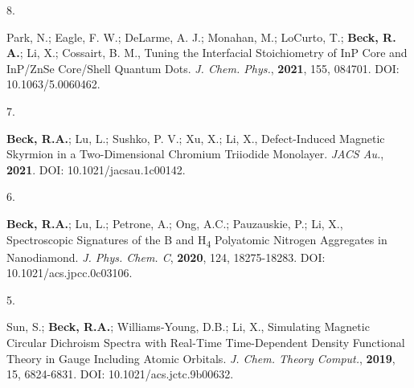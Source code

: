 

\begin{cvpublications}


\cvpublication
{8.}
{\parbox[t]{0.95\textwidth}{\strut Park, N.; Eagle, F. W.; DeLarme, A. J.; Monahan, M.; LoCurto, T.; \textbf{Beck, R. A.}; Li, X.; Cossairt, B. M.,
Tuning the Interfacial Stoichiometry of InP Core and InP/ZnSe Core/Shell Quantum Dots.
\textit{J. Chem. Phys.}, \textbf{2021}, 155, 084701.
DOI: 10.1063/5.0060462.}}




\cvpublication
{7.}
{\parbox[t]{0.95\textwidth}{\strut \textbf{Beck, R.A.}; Lu, L.; Sushko, P. V.; Xu, X.; Li, X.,
Defect-Induced Magnetic Skyrmion in a Two-Dimensional Chromium Triiodide Monolayer.
\textit{JACS Au.}, \textbf{2021}. 
DOI: 10.1021/jacsau.1c00142.}}




\cvpublication
{6.}
{\parbox[t]{0.95\textwidth}{\strut \textbf{Beck, R.A.}; Lu, L.; Petrone, A.; Ong, A.C.; Pauzauskie, P.; Li, X., 
Spectroscopic Signatures of the B and H\textsubscript{4} Polyatomic Nitrogen Aggregates in Nanodiamond.
\textit{J. Phys. Chem. C}, \textbf{2020}, 124, 18275-18283.
DOI: 10.1021/acs.jpcc.0c03106.}}




\cvpublication
{5.}
{\parbox[t]{0.95\textwidth}{\strut Sun, S.; \textbf{Beck, R.A.}; Williams-Young, D.B.; Li, X.,
Simulating Magnetic Circular Dichroism Spectra with Real-Time Time-Dependent Density Functional Theory in Gauge Including Atomic Orbitals.
\textit{J. Chem. Theory Comput.}, \textbf{2019}, 15, 6824-6831.
DOI: 10.1021/acs.jctc.9b00632.}}


\end{cvpublications}
